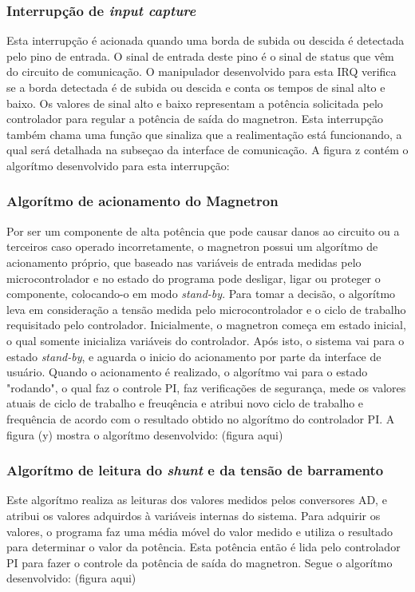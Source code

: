\subsubsection{Interrupção de \textit{input capture}}
Esta interrupção é acionada quando uma borda de subida ou descida é detectada pelo pino de entrada. O sinal de entrada deste pino é o sinal de status que vêm do circuito de comunicação. O manipulador desenvolvido para esta IRQ verifica se a borda detectada é de subida ou descida e conta os tempos de sinal alto e baixo. Os valores de sinal alto e baixo representam a potência solicitada pelo controlador para regular a potência de saída do magnetron. Esta interrupção também chama uma função que sinaliza que a realimentação está funcionando, a qual será detalhada na subseçao da interface de comunicação. A figura z contém o algorítmo desenvolvido para esta interrupção:




\subsubsection{Algorítmo de acionamento do Magnetron}
Por ser um componente de alta potência que pode causar danos ao circuito ou a terceiros caso operado incorretamente, o magnetron possui um algorítmo de acionamento próprio, que baseado nas variáveis de entrada medidas pelo microcontrolador e no estado do programa pode desligar, ligar ou proteger o componente, colocando-o em modo \textit{stand-by}. Para tomar a decisão, o algorítmo leva em consideração a tensão medida pelo microcontrolador e o ciclo de trabalho requisitado pelo controlador. Inicialmente, o magnetron começa em estado inicial, o qual somente inicializa variáveis do controlador. Após isto, o sistema vai para o estado \textit{stand-by}, e aguarda o inicio do acionamento por parte da interface de usuário. Quando o acionamento é realizado, o algorítmo vai para o estado "rodando", o qual faz o controle PI, faz verificações de segurança, mede os valores atuais de ciclo de trabalho e freuqência e atribui novo ciclo de trabalho e frequência de acordo com o resultado obtido no algorítmo do controlador PI. A figura (y) mostra o algorítmo desenvolvido:
(figura aqui)

\subsubsection{Algorítmo de leitura do \textit{shunt} e da tensão de barramento}
Este algorítmo realiza as leituras dos valores medidos pelos conversores AD, e atribui os valores adquirdos à variáveis internas do sistema. Para adquirir os valores, o programa faz uma média móvel do valor medido e utiliza o resultado para determinar o valor da potência. Esta potência então é lida pelo controlador PI para fazer o controle da potência de saída do magnetron. Segue o algorítmo desenvolvido:
(figura aqui)

